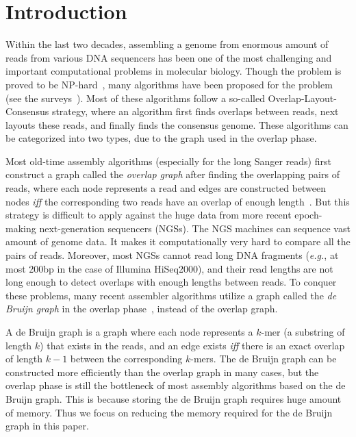 \documentclass{llncs}
\begin{document}
\section{Introduction}
\label{sec:introduction}
Within the last two decades, assembling a genome from enormous 
amount of reads from various DNA sequencers 
has been one of the most challenging and important 
computational problems in molecular biology. 
Though the problem is proved to be NP-hard~\cite{Mye95}, 
many algorithms have been proposed for the problem (see the 
surveys~\cite{KasMor06,MilKor10,Pop09}). 
Most of these algorithms follow a so-called Overlap-Layout-Consensus strategy, 
where an algorithm first finds overlaps between reads, next layouts 
these reads, and finally finds the consensus genome. 
These algorithms can be categorized into two types, due to the graph used in 
the overlap phase. 

Most old-time assembly algorithms (especially for the long Sanger reads) 
first construct a graph called the {\it overlap graph} 
after finding the overlapping pairs of reads, 
where each node represents a read and edges are constructed between nodes 
{\it iff} the corresponding two reads have an overlap of enough 
length~\cite{BatJaf02,HuaYan05,MyeSut00}. 
But this strategy is difficult to apply against the huge data from more recent 
epoch-making next-generation sequencers (NGSs). 
The NGS machines can sequence vast amount of genome data. 
It makes it computationally very hard to compare all the pairs of reads. 
Moreover, most NGSs cannot 
read long DNA fragments ({\it e.g.}, at most 200bp in the case of Illumina HiSeq2000),  
and their read lengths are not long enough to detect overlaps with enough lengths 
between reads. 
To conquer these problems, many recent assembler algorithms utilize a graph 
called the {\it de Bruijn graph} in the overlap 
phase~\cite{LiZhu09,MacPrz09,PevTan01,SahShi12,SimWon09,ZerBir08}, 
instead of the overlap graph. 

A de Bruijn graph is a graph where each node represents a $k$-mer
(a substring of length $k$)
that exists in the reads, and an edge exists {\it iff} there is an 
exact overlap of length $k-1$ between the corresponding $k$-mers. 
The de Bruijn graph can be constructed more efficiently than the overlap graph 
in many cases, 
but the overlap phase is still the bottleneck of most assembly algorithms based 
on the de Bruijn graph. 
This is because storing the de Bruijn graph requires huge amount of memory. 
Thus we focus on reducing the memory required for the de Bruijn graph in this paper. 
\end{document}
